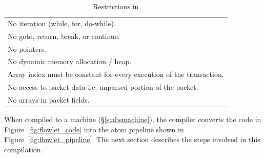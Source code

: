 \begin{table}
  \begin{tabular}{p{}}
    No iteration (while, for, do-while).\\
    No goto, return, break, or continue.\\
    No pointers.\\
    No dynamic memory allocation / heap.\\
    Array index must be constant for every execution of the transaction.\\
    No access to packet data i.e. unparsed portion of the packet.\\
    No arrays in packet fields.\\
  \end{tabular}
  \caption{Restrictions in \pktlanguage}
  \label{tab:restrict}
\end{table}

When compiled to a \absmachine machine (\S\ref{s:absmachine}), the \pktlanguage
compiler converts the code in Figure~\ref{fig:flowlet_code} into the atom
pipeline shown in Figure~\ref{fig:flowlet_pipeline}. The next section describes
the steps involved in this compilation.
%


